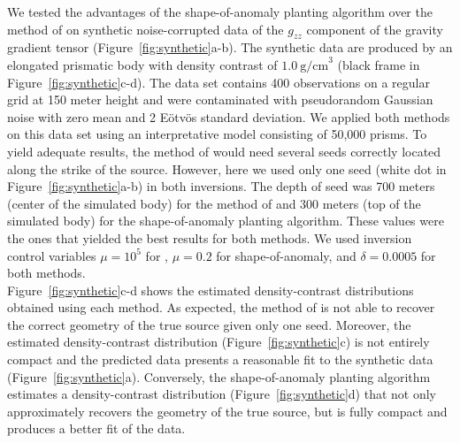 \documentclass{segabs}
\begin{document}
\begin{sloppypar}
We tested the advantages of the shape-of-anomaly planting algorithm over the
method of \citet{Uieda2011} on synthetic noise-corrupted data of the $g_{zz}$
component of the gravity gradient tensor (Figure~\ref{fig:synthetic}a-b).
The synthetic data are produced by an elongated prismatic body with
density contrast of $1.0\ \mathrm{g/cm}^3$ (black frame in
Figure~\ref{fig:synthetic}c-d).
The data set contains 400 observations on a regular grid at 150 meter height and
were contaminated with pseudorandom Gaussian noise with zero mean and
2 E\"otv\"os standard deviation.
We applied both methods on this data set using an interpretative model
consisting of 50,000 prisms.
To yield adequate results, the method of \citet{Uieda2011} would need
several seeds correctly located along the strike of the source.
However, here we used only one seed (white dot in Figure~\ref{fig:synthetic}a-b)
in both inversions.
The depth of seed was 700 meters (center of the simulated body) for the method
of \citet{Uieda2011} and 300 meters (top of the simulated body) for the
shape-of-anomaly planting algorithm.
These values were the ones that yielded the best results for both methods.
We used inversion control variables $\mu = 10^{5}$ for \citet{Uieda2011},
$\mu = 0.2$ for shape-of-anomaly, and $\delta = 0.0005$ for both methods.
\\[0.2cm]
Figure~\ref{fig:synthetic}c-d shows the estimated density-contrast distributions
obtained using each method.
As expected, the method of \citet{Uieda2011} is not able to recover the correct
geometry of the true source given only one seed.
Moreover, the estimated density-contrast distribution
(Figure~\ref{fig:synthetic}c) is not entirely compact and the predicted data
presents a reasonable fit to the synthetic data (Figure~\ref{fig:synthetic}a).
Conversely, the shape-of-anomaly planting algorithm estimates a density-contrast
distribution (Figure~\ref{fig:synthetic}d) that not only approximately recovers
the geometry of the true source, but is fully compact and produces a better fit
of the data.
\end{sloppypar}
\end{document}
